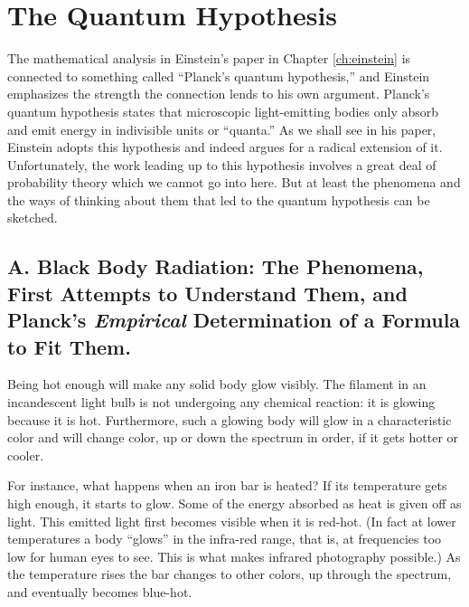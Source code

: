 \chapter{The Quantum Hypothesis}




\renewcommand{\theequation}{\arabic{equation}}

The mathematical analysis in Einstein's paper in Chapter \ref{ch:einstein} is connected
to something called ``Planck's quantum hypothesis,'' and Einstein
emphasizes the strength the connection lends to his own argument.
Planck's quantum hypothesis states that microscopic light-emitting
bodies only absorb and emit energy in indivisible units or ``quanta.''
As we shall see in his paper, Einstein adopts this hypothesis and indeed
argues for a radical extension of it. Unfortunately, the work leading up
to this hypothesis involves a great deal of probability theory which we
cannot go into here. But at least the phenomena and the ways of thinking
about them that led to the quantum hypothesis can be sketched.

\section*{A. Black Body Radiation: The Phenomena, First Attempts to
Understand Them, and Planck's \emph{Empirical} Determination of a
Formula to Fit Them.}

Being hot enough will make any solid body glow visibly. The filament in
an incandescent light bulb is not undergoing any chemical reaction: it
is glowing because it is hot. Furthermore, such a glowing body will glow
in a characteristic color and will change color, up or down the spectrum
in order, if it gets hotter or cooler.

For instance, what happens when an iron bar is heated? If its
temperature gets high enough, it starts to glow. Some of the energy
absorbed as heat is given off as light. This emitted light first becomes
visible when it is red-hot. (In fact at lower temperatures a body
``glows'' in the infra-red range, that is, at frequencies too low for
human eyes to see. This is what makes infrared photography possible.) As
the temperature rises the bar changes to other colors, up through the
spectrum, and eventually becomes blue-hot.


